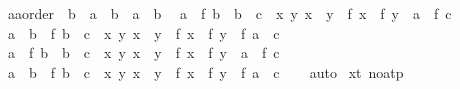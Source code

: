 \begin{isabellebody}
\ \ {\isachardoublequoteopen}{\isacharparenleft}{\kern0pt}a{\isacharcolon}{\kern0pt}{\isacharcolon}{\kern0pt}{\isacharprime}{\kern0pt}a{\isacharcolon}{\kern0pt}{\isacharcolon}{\kern0pt}order{\isacharparenright}{\kern0pt}\ {\isasymnoteq}\ b\ {\isasymLongrightarrow}\ a\ {\isasymge}\ b\ {\isasymLongrightarrow}\ a\ {\isachargreater}{\kern0pt}\ b{\isachardoublequoteclose}\isanewline
\ \ {\isachardoublequoteopen}a\ {\isacharequal}{\kern0pt}\ f\ b\ {\isasymLongrightarrow}\ b\ {\isachargreater}{\kern0pt}\ c\ {\isasymLongrightarrow}\ {\isacharparenleft}{\kern0pt}{\isasymAnd}x\ y{\isachardot}{\kern0pt}\ x\ {\isachargreater}{\kern0pt}\ y\ {\isasymLongrightarrow}\ f\ x\ {\isachargreater}{\kern0pt}\ f\ y{\isacharparenright}{\kern0pt}\ {\isasymLongrightarrow}\ a\ {\isachargreater}{\kern0pt}\ f\ c{\isachardoublequoteclose}\isanewline
\ \ {\isachardoublequoteopen}a\ {\isachargreater}{\kern0pt}\ b\ {\isasymLongrightarrow}\ f\ b\ {\isacharequal}{\kern0pt}\ c\ {\isasymLongrightarrow}\ {\isacharparenleft}{\kern0pt}{\isasymAnd}x\ y{\isachardot}{\kern0pt}\ x\ {\isachargreater}{\kern0pt}\ y\ {\isasymLongrightarrow}\ f\ x\ {\isachargreater}{\kern0pt}\ f\ y{\isacharparenright}{\kern0pt}\ {\isasymLongrightarrow}\ f\ a\ {\isachargreater}{\kern0pt}\ c{\isachardoublequoteclose}\isanewline
\ \ {\isachardoublequoteopen}a\ {\isacharequal}{\kern0pt}\ f\ b\ {\isasymLongrightarrow}\ b\ {\isasymge}\ c\ {\isasymLongrightarrow}\ {\isacharparenleft}{\kern0pt}{\isasymAnd}x\ y{\isachardot}{\kern0pt}\ x\ {\isasymge}\ y\ {\isasymLongrightarrow}\ f\ x\ {\isasymge}\ f\ y{\isacharparenright}{\kern0pt}\ {\isasymLongrightarrow}\ a\ {\isasymge}\ f\ c{\isachardoublequoteclose}\isanewline
\ \ {\isachardoublequoteopen}a\ {\isasymge}\ b\ {\isasymLongrightarrow}\ f\ b\ {\isacharequal}{\kern0pt}\ c\ {\isasymLongrightarrow}\ {\isacharparenleft}{\kern0pt}{\isasymAnd}x\ y{\isachardot}{\kern0pt}\ x\ {\isasymge}\ y\ {\isasymLongrightarrow}\ f\ x\ {\isasymge}\ f\ y{\isacharparenright}{\kern0pt}\ {\isasymLongrightarrow}\ f\ a\ {\isasymge}\ c{\isachardoublequoteclose}\isanewline
%
\isadelimproof
\ \ %
\endisadelimproof
%
\isatagproof
{}\isamarkupfalse%
\ auto%
\endisatagproof
{\isafoldproof}%
%
\isadelimproof
\isanewline
%
\endisadelimproof
\isanewline
{}\isamarkupfalse%
\ xt{}\ {\isacharbrackleft}{\kern0pt}no{\isacharunderscore}{\kern0pt}atp{\isacharbrackright}{\kern0pt}{\isacharcolon}{\kern0pt}\isanewline

\end{isabellebody}
